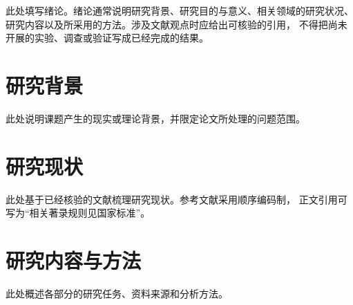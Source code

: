 \yibinopeningchapter

此处填写绪论。绪论通常说明研究背景、研究目的与意义、相关领域的研究状况、
研究内容以及所采用的方法。涉及文献观点时应给出可核验的引用，
不得把尚未开展的实验、调查或验证写成已经完成的结果。

\section{研究背景}

此处说明课题产生的现实或理论背景，并限定论文所处理的问题范围。

\section{研究现状}

此处基于已经核验的文献梳理研究现状。参考文献采用顺序编码制，
正文引用可写为“相关著录规则见国家标准”。

\section{研究内容与方法}

此处概述各部分的研究任务、资料来源和分析方法。
